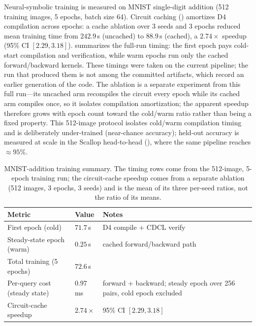 Neural-symbolic training is measured on MNIST single-digit addition (512 training images, 5 epochs, batch size 64). Circuit caching () amortizes D4 compilation across epochs: a cache ablation over 3 seeds and 3 epochs reduced mean training time from $242.9$\,s (uncached) to $88.9$\,s (cached), a $2.74\times$ speedup (95\% CI $[2.29, 3.18]$).  summarizes the full-run timing: the first epoch pays cold-start compilation and verification, while warm epochs run only the cached forward/backward kernels. These timings were taken on the current pipeline; the run that produced them is not among the committed artifacts, which record an earlier generation of the code. The ablation is a separate experiment from this full run---its uncached arm recompiles the circuit every epoch while its cached arm compiles once, so it isolates compilation amortization; the apparent speedup therefore grows with epoch count toward the cold/warm ratio rather than being a fixed property. This 512-image protocol isolates cold/warm compilation timing and is deliberately under-trained (near-chance accuracy); held-out accuracy is measured at scale in the Scallop head-to-head (), where the same pipeline reaches ${\approx}95\%$.

\begin{table}[htbp]
  \centering
  \caption{MNIST-addition training summary. The timing rows come from the 512-image, 5-epoch training run; the circuit-cache speedup comes from a separate ablation (512 images, 3 epochs, 3 seeds) and is the mean of its three per-seed ratios, not the ratio of its means.}
  \label{tab:training-summary}
  \small
  \begin{tabularx}{\linewidth}{@{}l l L@{}}
    \toprule
    \textbf{Metric} & \textbf{Value} & \textbf{Notes} \\
    \midrule
    First epoch (cold)         & $71.7$\,s  & D4 compile + CDCL verify \\
    Steady-state epoch (warm)  & $0.25$\,s  & cached forward/backward path \\
    Total training (5 epochs)  & $72.6$\,s  & \\
    Per-query cost (steady state) & $0.97$\,ms & forward + backward; steady epoch over 256 pairs, cold epoch excluded \\
    Circuit-cache speedup      & $2.74\times$ & 95\% CI $[2.29, 3.18]$ \\
    \bottomrule
  \end{tabularx}
\end{table}

